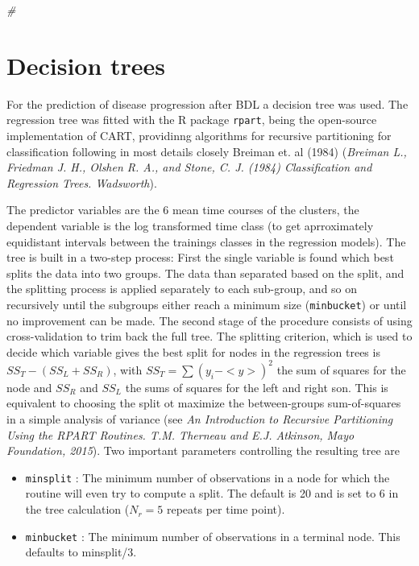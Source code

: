 \documentclass[]{article}
\newenvironment{Shaded}{\begin{snugshade}}{\end{snugshade}}
\newcommand{\CommentTok}[1]{\textcolor[rgb]{0.56,0.35,0.01}{\textit{{#1}}}}
\begin{document}
\begin{Shaded}
\begin{Highlighting}[]
\CommentTok{#}
\end{Highlighting}
\end{Shaded}

\section{Decision trees}\label{decision-trees}

For the prediction of disease progression after BDL a decision tree was
used. The regression tree was fitted with the R package \texttt{rpart},
being the open-source implementation of CART, providinng algorithms for
recursive partitioning for classification following in most details
closely Breiman et. al (1984) (\emph{Breiman L., Friedman J. H., Olshen
R. A., and Stone, C. J. (1984) Classification and Regression Trees.
Wadsworth}).

The predictor variables are the 6 mean time courses of the clusters, the
dependent variable is the log transformed time class (to get
aprroximately equidistant intervals between the trainings classes in the
regression models). The tree is built in a two-step process: First the
single variable is found which best splits the data into two groups. The
data than separated based on the split, and the splitting process is
applied separately to each sub-group, and so on recursively until the
subgroups either reach a minimum size (\texttt{minbucket}) or until no
improvement can be made. The second stage of the procedure consists of
using cross-validation to trim back the full tree. The splitting
criterion, which is used to decide which variable gives the best split
for nodes in the regression trees is \(SS_{T}-(SS_{L} + SS_{R})\), with
\(SS_{T} = \sum{(y_{i}-<y>)^2}\) the sum of squares for the node and
\(SS_{R}\) and \(SS_{L}\) the sums of squares for the left and right
son. This is equivalent to choosing the split ot maximize the
between-groups sum-of-squares in a simple analysis of variance (see
\emph{An Introduction to Recursive Partitioning Using the RPART
Routines. T.M. Therneau and E.J. Atkinson, Mayo Foundation, 2015}). Two
important parameters controlling the resulting tree are

\begin{itemize}
\itemsep1pt\parskip0pt
\item
  \texttt{minsplit} : The minimum number of observations in a node for
  which the routine will even try to compute a split. The default is 20
  and is set to 6 in the tree calculation (\(N_{r}=5\) repeats per time
  point).
\item
  \texttt{minbucket} : The minimum number of observations in a terminal
  node. This defaults to minsplit/3.
\end{itemize}
\end{document}
